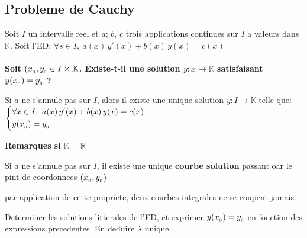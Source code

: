 \documentclass[12pt,twoside,a4paper]{article}
\begin{document}
		\subsection{Probleme de Cauchy}
			Soit $I$ un intervalle reel et $a$; $b$, $c$ trois applications continues sur $I$ a valeurs dans $\mathbb{K}$.
			Soit l'ED: $\forall s\in I,\ a(x)\,y'(x)+b(x)\,y(x)=c(x)$\\
			\\
			\textbf{Soit $(x_{_{0}},y_{_{0}}\in I\times\mathbb{K}$. Existe-t-il une solution $y:x\rightarrow\mathbb{K}$ satisfaisant $y(x_{_{0}})=y_{_{0}}$ ?}
			\begin{prop}
				Si $a$ ne s'annule pas sur $I$, alors il existe une unique solution $y:I\rightarrow\mathbb{K}$ telle que:\\
				$\left\{\begin{aligned}&\forall x\in I,\ a(x)\,y'(x)+b(x)\,y(x)=c(x)\\&y(x\uu0)=y\uu0\end{aligned}\right.$
			\end{prop}
			\textbf{Remarques si $\mathbb{K=R}$}
			\begin{liste}
				\item Si $a$ ne s'annule pas sur $I$, il existe une unique \textbf{courbe solution} passant oar le pint de coordonnees $(x_{_{0}},y_{_{0}})$
				\item par application de cette propriete, deux courbes integrales ne se coupent jamais.
			\end{liste}
			\begin{preuve}
				Determiner les solutions litterales de l'ED, et exprimer $y(x_{_{0}})=y_{_{0}}$ en fonction des expressions precedentes. En deduire $\lambda$ unique.
			\end{preuve}
\end{document}
